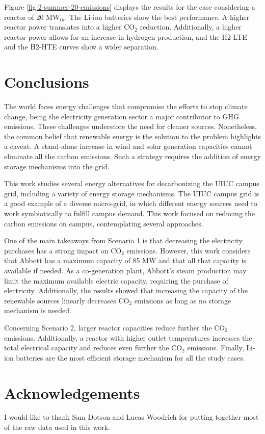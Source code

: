 \documentclass{anstrans}
\begin{document}
Figure \ref{fig:2-summer-20-emissions} displays the results for the case considering a reactor of 20 MW$_{th}$.
The Li-ion batteries show the best performance.
A higher reactor power translates into a higher CO$_2$ reduction.
Additionally, a higher reactor power allows for an increase in hydrogen production, and the H2-LTE and the H2-HTE curves show a wider separation.


\section{Conclusions}

The world faces energy challenges that compromise the efforts to stop climate change, being the electricity generation sector a major contributor to GHG emissions.
These challenges underscore the need for cleaner sources.
Nonetheless, the common belief that renewable energy is the solution to the problem highlights a caveat.
A stand-alone increase in wind and solar generation capacities cannot eliminate all the carbon emissions.
Such a strategy requires the addition of energy storage mechanisms into the grid.

This work studies several energy alternatives for decarbonizing the UIUC campus grid, including a variety of energy storage mechanisms.
The UIUC campus grid is a good example of a diverse micro-grid, in which different energy sources need to work symbiotically to fulfill campus demand.
This work focused on reducing the carbon emissions on campus, contemplating several approaches.

One of the main takeaways from Scenario 1 is that decreasing the electricity purchases has a strong impact on CO$_2$ emissions.
However, this work considers that Abbott has a maximum capacity of 85 MW and that all that capacity is available if needed. As a co-generation plant, Abbott’s steam production may limit the maximum available electric capacity, requiring the purchase of electricity.
Additionally, the results showed that increasing the capacity of the renewable sources linearly decreases CO$_2$ emissions as long as no storage mechanism is needed.

Concerning Scenario 2, larger reactor capacities reduce further the CO$_2$ emissions.
Additionally, a reactor with higher outlet temperatures increases the total electrical capacity and reduces even further the CO$_2$ emissions.
Finally, Li-ion batteries are the most efficient storage mechanism for all the study cases.


\section{Acknowledgements}

I would like to thank Sam Dotson and Lucas Woodrich for putting together most of the raw data used in this work.




\end{document}
